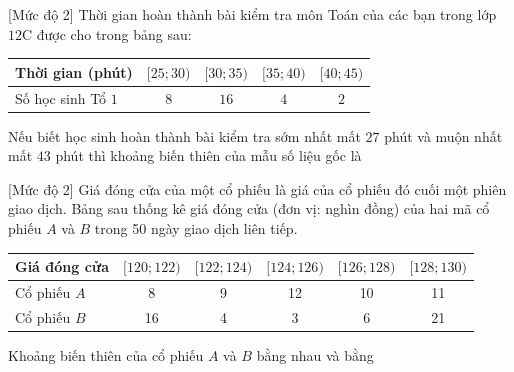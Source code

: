 \begin{bt}%
[Mức độ 2]
	Thời gian hoàn thành bài kiểm tra môn Toán của các bạn trong lớp $12$C được cho trong bảng sau:
	\begin{center}
		\begin{tabular}{|l|c|c|c|c|}
			\hline
			Thời gian (phút) & $[25;30 )$ & $[30;35)$ &$[35;40 )$ & $[40;45)$ \\
			\hline
			Số học sinh Tổ $1$ & $8$ & $16$ & $4$ & $2$ \\
			\hline
		\end{tabular}
	\end{center}
	Nếu biết học sinh hoàn thành bài kiểm tra sớm nhất mất $27$ phút và muộn nhất mất $43$ phút thì khoảng biến thiên của mẫu số liệu gốc là
\end{bt}

\begin{bt}%
[Mức độ 2]
Giá đóng cửa của một cổ phiếu là giá của cổ phiếu đó cuối một phiên giao dịch. Bảng sau thống kê giá đóng cửa (đơn vị: nghìn đồng) của hai mã cổ phiếu $A$ và $B$ trong 50 ngày giao dịch liên tiếp.
\begin{center}
	\begin{tabular}{|l|c|c|c|c|c|}
		\hline Giá đóng cửa &$[120 ; 122)$ & {$[122 ; 124)$} & {$[124 ; 126)$} & {$[126 ; 128)$} & {$[128 ; 130)$} \\
		\hline Cổ phiếu $A$ & 8 & 9 & 12 & 10 & 11 \\
		\hline Cổ phiếu $B$ & 16 & 4 & 3 & 6 & 21 \\
		\hline
	\end{tabular}
\end{center}
Khoảng biến thiên của cổ phiếu $A$ và $B$ bằng nhau và bằng 
\end{bt}

